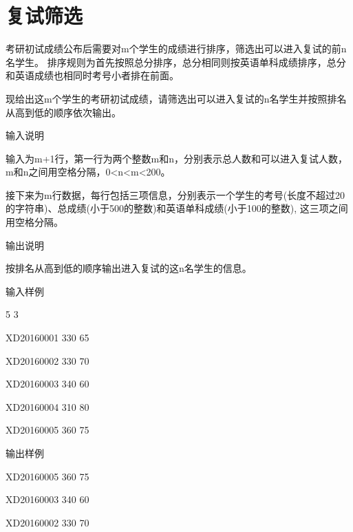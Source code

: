 \section{复试筛选}	
考研初试成绩公布后需要对m个学生的成绩进行排序，筛选出可以进入复试的前n名学生。
排序规则为首先按照总分排序，总分相同则按英语单科成绩排序，总分和英语成绩也相同时考号小者排在前面。

现给出这m个学生的考研初试成绩，请筛选出可以进入复试的n名学生并按照排名从高到低的顺序依次输出。

输入说明	

输入为m+1行，第一行为两个整数m和n，分别表示总人数和可以进入复试人数，m和n之间用空格分隔，0<n<m<200。

接下来为m行数据，每行包括三项信息，分别表示一个学生的考号(长度不超过20的字符串)、总成绩(小于500的整数)和英语单科成绩(小于100的整数), 这三项之间用空格分隔。

输出说明
	
按排名从高到低的顺序输出进入复试的这n名学生的信息。

输入样例	

5 3

XD20160001 330 65

XD20160002 330 70

XD20160003 340 60

XD20160004 310 80

XD20160005 360 75

输出样例	

XD20160005 360 75

XD20160003 340 60

XD20160002 330 70

